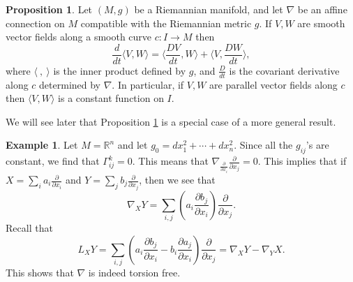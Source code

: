 \documentclass{amsart}
\numberwithin{equation}{section}
\theoremstyle{definition}
\newtheorem{example}[definition]{Example}
\theoremstyle{theorem}
\newtheorem{proposition}[definition]{Proposition}
\begin{document}
\begin{proposition}\label{compatible-g}
Let $(M,g)$ be a Riemannian manifold, and let $\nabla$ be an affine connection on $M$ 
compatible with the Riemannian metric $g$. If $V,W$ are smooth vector fields along
a smooth curve $c:I\to M$ then
$$
\frac{d}{dt}\langle V, W\rangle =\langle\frac{DV}{dt}, W\rangle + \langle V,\frac{DW}{dt}\rangle,
$$
where $\langle\ , \ \rangle$ is the inner product defined by $g$, and 
$\frac{D}{dt}$ is the covariant derivative along $c$ determined by $\nabla$.
In particular, if $V, W$ are parallel vector fields along $c$ then 
$\langle V, W\rangle$ is a constant function on $I$.
\end{proposition}

We will see later that Proposition \ref{compatible-g} is a special case of a
more general result.

\begin{example}
Let $M = \mathbb{R}^n$ and let $g_0 = dx_1^2 + \cdots + dx_n^2$. Since all the $g_{ij}$'s are constant, we find that $\Gamma_{ij}^k = 0$. This means that $\nabla_\frac{\partial}{\partial x_i} \frac{\partial}{\partial x_j} = 0$. This implies that if $X = \sum_{i} a_i \frac{\partial}{\partial x_i}$ and $Y = \sum_{j} b_j \frac{\partial}{\partial x_j}$, then we see that 
\[
\nabla_XY = \sum_{i,j} \left(a _i  \frac{\partial b_j}{\partial x_i}\right) \frac{\partial}{\partial x_j}.
\]
Recall that 
\[
L_XY = \sum_{i,j} \left( a_i \frac{\partial b_j}{\partial x_i} - b_i \frac{\partial a_j}{\partial x_i}\right) \frac{\partial}{\partial x_j} = \nabla_XY - \nabla_YX.
\]
This shows that $\nabla$ is indeed torsion free. 
\end{example}
\end{document}

